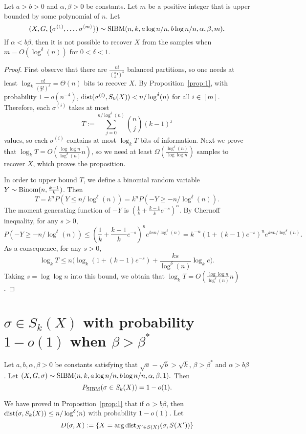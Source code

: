\documentclass{article}
\begin{document}
\begin{proposition}  \label{prop:ab}
Let $a>b>0$ and $\alpha,\beta>0$ be constants. Let $m$ be a positive integer that is upper bounded by some polynomial of $n$.
Let 
$$
(X,G,\{\sigma^{(1)},\dots,\sigma^{(m)}\})\sim \operatorname{SIBM}(n,k, a\log n/n, b\log n/n,\alpha,\beta, m) .
$$
If $\alpha<b\beta$, then it is not possible to recover $X$ from the samples when $m=O(\log^{\delta}(n))$ for $0 < \delta < 1$.
\end{proposition}

\begin{proof}
First observe that there are $\frac{n!}{(\frac{n}{k}!)^k}$ balanced partitions, so one needs at least $\log_k \frac{n!}{(\frac{n}{k}!)^k}=\Theta(n)$ bits to recover $X$.
By Proposition~\ref{prop:1}, with probability $1-o(n^{-4})$, $\operatorname{dist}(\sigma^{(i)}, S_k(X))< n/\log^{\delta}(n)$
for all $i\in[m]$. Therefore, each $\sigma^{(i)}$ takes at most
$$
T:=\sum_{j=0}^{n/\log^{\delta}(n)} \binom{n}{j}(k-1)^j
$$
values, so each $\sigma^{(i)}$ contains at most $\log_k T$ bits of information. Next we prove that $\log_k T=O(\frac{\log\log n}{\log^{\delta}(n)} n)$, so we need at least $\Omega(\frac{\log^{\delta}(n)}{\log\log n})$ samples to recover $X$, which proves the proposition.

In order to upper bound $T$, we define a binomial random variable $Y\sim\operatorname{Binom}(n,\frac{k-1}{k})$. Then
$$
T=k^n P(Y\le n/\log^{\delta}(n))
= k^n P(-Y\ge -n/\log^{\delta}(n)).
$$
The moment generating function of $-Y$ is $(\frac{1}{k}+\frac{k-1}{k}e^{-s})^n$. By Chernoff inequality, for any $s>0$,
$$
P(-Y\ge - n/\log^{\delta}(n)) \le
(\frac{1}{k}+\frac{k-1}{k}e^{-s})^n
e^{ksn/\log^{\delta}(n)}
= k^{-n} (1+(k-1)e^{-s})^n e^{ksn/\log^{\delta}(n)} .
$$
As a consequence, for any $s>0$,
$$
\log_k T\le n\Big(\log_k(1+(k-1)e^{-s})
+\frac{ks}{\log^{\delta}(n)}\log_k e \Big) .
$$
Taking $s=\log\log n$ into this bound, we obtain that $\log_k T=O(\frac{\log\log n}{\log^{\delta}(n)} n)$.
\end{proof}

\section{$\sigma \in S_k(X)$ with probability $1-o(1)$ when $\beta>\beta^\ast$} \label{sect:equal}
\begin{proposition} \label{prop:tt}
Let $a,b,\alpha,\beta> 0$ be constants satisfying that $\sqrt{a}-\sqrt{b} > \sqrt{k}$, $\beta>\beta^\ast$ and $\alpha>b\beta$. 
Let 
$
(X,G,\sigma) \sim \operatorname{SIBM}(n,k, a\log n/n, b\log n/n,\alpha,\beta, 1) .
$
Then
$$
P_{\operatorname{SIBM}}(\sigma \in S_k(X))=1-o(1) .
$$
\end{proposition}
We have proved in Proposition~\ref{prop:1} that if $\alpha>b\beta$, then $\operatorname{dist}(\sigma, S_k(X)) \le n/\log^{\delta}(n)$
with probability $1-o(1)$. Let 
\begin{equation}\label{eq:DsigmaX}
D(\sigma, X):= \{X = \arg\operatorname{dist}_{X'\in S(X)}(\sigma, S(X'))\}
\end{equation}
\end{document}

